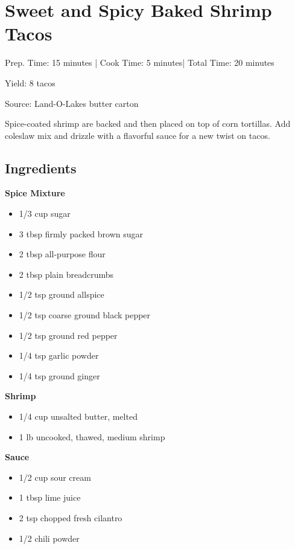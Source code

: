\section{Sweet and Spicy Baked Shrimp Tacos}

\begin{center}
Prep. Time: 15 minutes |
Cook Time: 5 minutes|
Total Time: 20 minutes
 
Yield: 8 tacos

\vspace{1em}

Source: Land-O-Lakes butter carton\par

\vspace{1em}
Spice-coated shrimp are backed and then placed on top of corn tortillas.
Add coleslaw mix and drizzle with a flavorful sauce for a new twist on tacos.

\end{center}

\subsection{Ingredients}
\textbf{Spice Mixture}
\begin{itemize}
    \item 1/3 cup sugar
    \item 3 tbsp firmly packed brown sugar
    \item 2 tbsp all-purpose flour
    \item 2 tbsp plain breadcrumbs
    \item 1/2 tsp ground allspice
    \item 1/2 tsp coarse ground black pepper
    \item 1/2 tsp ground red pepper
    \item 1/4 tsp garlic powder
    \item 1/4 tsp ground ginger
\end{itemize}

\noindent\textbf{Shrimp}
\begin{itemize}
    \item 1/4 cup unsalted butter, melted
    \item 1 lb uncooked, thawed, medium shrimp
\end{itemize}

\noindent\textbf{Sauce}
\begin{itemize}
    \item 1/2 cup sour cream
    \item 1 tbsp lime juice
    \item 2 tsp chopped fresh cilantro
    \item 1/2 chili powder
\end{itemize}

